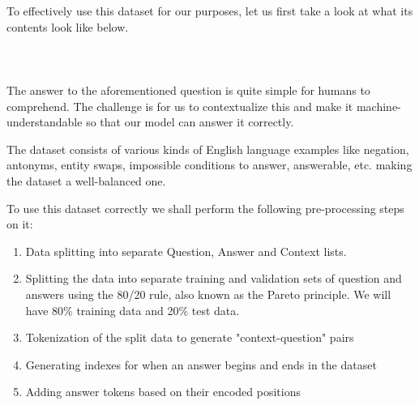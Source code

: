 \documentclass[12pt]{report}
\begin{document}
    To effectively use this dataset for our purposes, let us first take a look at what its contents look like below.\\ \\
    \noindent{}
    \\ \\

    The answer to the aforementioned question is quite simple for humans to comprehend. The challenge is for us to contextualize this and make it machine-understandable so that our model can answer it correctly.

    The dataset consists of various kinds of English language examples like negation, antonyms, entity swaps, impossible conditions to answer, answerable, etc. making the dataset a well-balanced one.

    To use this dataset correctly we shall perform the following pre-processing steps on it:

    \begin{enumerate}
    	\item Data splitting into separate Question, Answer and Context lists.
    	\item Splitting the data into separate training and validation sets of  question and answers using the 80/20 rule, also known as the Pareto principle. We will have 80\% training data and 20\% test data.
    	\item Tokenization of the split data to generate "context-question" pairs
    	\item Generating indexes for when an answer begins and ends in the dataset
    	\item Adding answer tokens based on their encoded positions
    \end{enumerate}
\end{document}
